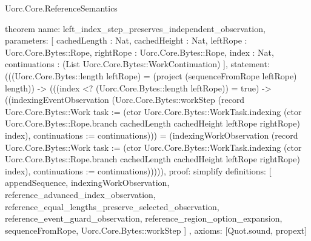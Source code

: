 \begin{lexlean}{Uorc.Core.ReferenceSemantics}
\begin{semanticmodule}
theorem{
  name: left_index_step_preserves_independent_observation,
  parameters: [
    cachedLength : Nat,
    cachedHeight : Nat,
    leftRope : Uorc.Core.Bytes::Rope,
    rightRope : Uorc.Core.Bytes::Rope,
    index : Nat,
    continuations : (List Uorc.Core.Bytes::WorkContinuation)
  ],
  statement: (((Uorc.Core.Bytes::length leftRope) = (project (sequenceFromRope leftRope) length)) -> (((index <? (Uorc.Core.Bytes::length leftRope)) = true) -> ((indexingEventObservation (Uorc.Core.Bytes::workStep (record Uorc.Core.Bytes::Work {task := (ctor Uorc.Core.Bytes::WorkTask.indexing (ctor Uorc.Core.Bytes::Rope.branch cachedLength cachedHeight leftRope rightRope) index), continuations := continuations}))) = (indexingWorkObservation (record Uorc.Core.Bytes::Work {task := (ctor Uorc.Core.Bytes::WorkTask.indexing (ctor Uorc.Core.Bytes::Rope.branch cachedLength cachedHeight leftRope rightRope) index), continuations := continuations}))))),
  proof: simplify{
    definitions: [
      appendSequence,
      indexingWorkObservation,
      reference_advanced_index_observation,
      reference_equal_lengths_preserve_selected_observation,
      reference_event_guard_observation,
      reference_region_option_expansion,
      sequenceFromRope,
      Uorc.Core.Bytes::workStep
    ]
  },
  axioms: [Quot.sound, propext]
}
\end{semanticmodule}
\end{lexlean}
